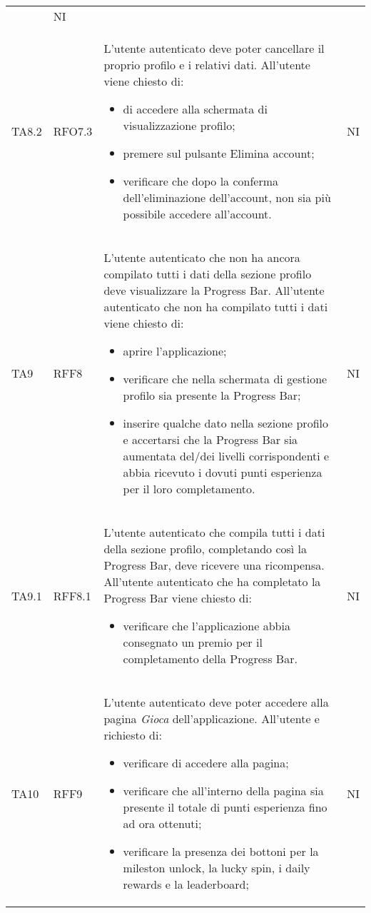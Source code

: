 \begin{longtable}{ >{\centering}p{} >{\centering}p{} >{\centering}p{}
			>{\centering}p{}}
\begin{itemize}
		 \end{itemize}	&	NI	\tabularnewline
		 TA8.2 & RFO7.3 	&	L'utente autenticato deve poter cancellare il proprio profilo e i relativi dati. All'utente viene chiesto di:
		 \begin{itemize}
		 	\item di accedere alla schermata di visualizzazione profilo;
		 	\item premere sul pulsante Elimina account;
		 	\item verificare che dopo la conferma dell'eliminazione dell'account, non sia più possibile accedere all'account.
		 \end{itemize}	&	NI	\tabularnewline
		 TA9 & RFF8	&	L'utente autenticato che non ha ancora compilato tutti i dati della sezione profilo deve visualizzare la Progress Bar. All'utente autenticato che non ha compilato tutti i dati viene chiesto di:
		 \begin{itemize}
		 	\item aprire l'applicazione;
		 	\item verificare che nella schermata di gestione profilo sia presente la Progress Bar;
		 	\item inserire qualche dato nella sezione profilo e accertarsi che la Progress Bar sia aumentata del/dei livelli corrispondenti e abbia ricevuto i dovuti punti esperienza per il loro completamento.
		 \end{itemize}	&	NI	\tabularnewline
		 TA9.1	& RFF8.1 &	L'utente autenticato che compila tutti i dati della sezione profilo, completando così la Progress Bar, deve ricevere una ricompensa. All'utente autenticato che ha completato la Progress Bar viene chiesto di:
		 \begin{itemize}
		 	\item verificare che l'applicazione abbia consegnato un premio per il completamento della Progress Bar.
		 \end{itemize}	&	NI	\tabularnewline
		 TA10	& RFF9 &	L'utente autenticato deve poter accedere alla pagina \textit{Gioca} dell'applicazione. All'utente e richiesto di:
		 \begin{itemize}
		 	\item verificare di accedere alla pagina;
		 	\item verificare che all'interno della pagina sia presente il totale di punti esperienza fino ad ora ottenuti;
		 	\item verificare la presenza dei bottoni per la mileston unlock, la lucky spin, i daily rewards e la leaderboard;
		 \end{itemize}	&	NI	\tabularnewline

\end{longtable}
